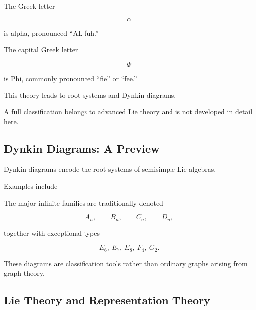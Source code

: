 The Greek letter

\[ \alpha \]

is alpha, pronounced ``AL-fuh.''

The capital Greek letter

\[ \Phi \]

is Phi, commonly pronounced ``fie'' or ``fee.''

This theory leads to root systems and Dynkin diagrams.

A full classification belongs to advanced Lie theory and is not developed
in detail here.

\subsection{Dynkin Diagrams: A Preview}
\label{subsec:dynkin-diagrams-preview}

Dynkin diagrams encode the root systems of semisimple Lie algebras.

Examples include

\begin{center}
\qquad\qquad
{}
\end{center}

The major infinite families are traditionally denoted

\[ A_n,\qquad B_n,\qquad C_n,\qquad D_n, \]

together with exceptional types

\[ E_6,\ E_7,\ E_8,\ F_4,\ G_2. \]

These diagrams are classification tools rather than ordinary graphs arising
from graph theory.

\subsection{Lie Theory and Representation Theory}
\label{subsec:lie-representation-connection}

